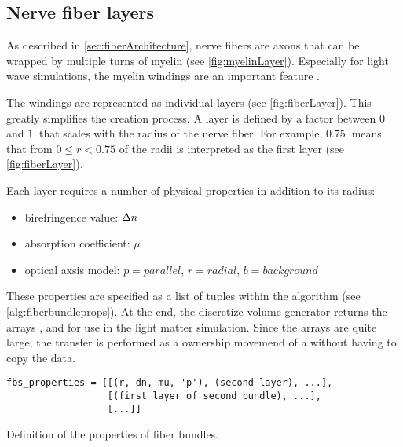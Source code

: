 \subsection{Nerve fiber layers}
%
As described in \cref{sec:fiberArchitecture}, nerve fibers are axons that can be wrapped by multiple turns of myelin (see \cref{fig:myelinLayer}).
Especially for light wave simulations, the myelin windings are an important feature \cite{MenzelDissertation}.
\par
%
The windings are represented as individual layers (see \cref{fig:fiberLayer}).
This greatly simplifies the creation process.
A layer is defined by a factor between $\SI{0}{}$ and $\SI{1}{}$ that scales with the radius of the nerve fiber.
For example, $\SI{0.75}{}$ means that from $0 \leq r < 0.75$ of the radii is interpreted as the first layer (see \cref{fig:fiberLayer}).
\par
%
Each layer requires a number of physical properties in addition to its radius:
%
\begin{itemize}[nosep]
    \item birefringence value: $\textnormal{$\Delta n$}$
    \item absorption coefficient: $\mu$
    \item optical axsis model: $p=\mathit{parallel}$, $r=\mathit{radial}$, $b=\mathit{background}$
\end{itemize}
%
These properties are specified as a list of tuples within the algorithm (see \cref{alg:fiberbundleprops}).
%
%
At the end, the discretize volume generator returns the arrays \tissue{}, \opticalaxis{} and \propertylist{} for use in the light matter simulation.
Since the arrays are quite large, the transfer is performed as a ownership movemend of a  without having to copy the data.
% 
\begin{lstfloat}[!ht]
\lstset{style=python}
\begin{lstlisting}[]
fbs_properties = [[(r, dn, mu, 'p'), (second layer), ...],
                  [(first layer of second bundle), ...],
                  [...]]
\end{lstlisting}
\caption{Definition of the properties of fiber bundles.}
\label{alg:fiberbundleprops}
\end{lstfloat}
% 
% 
% 
